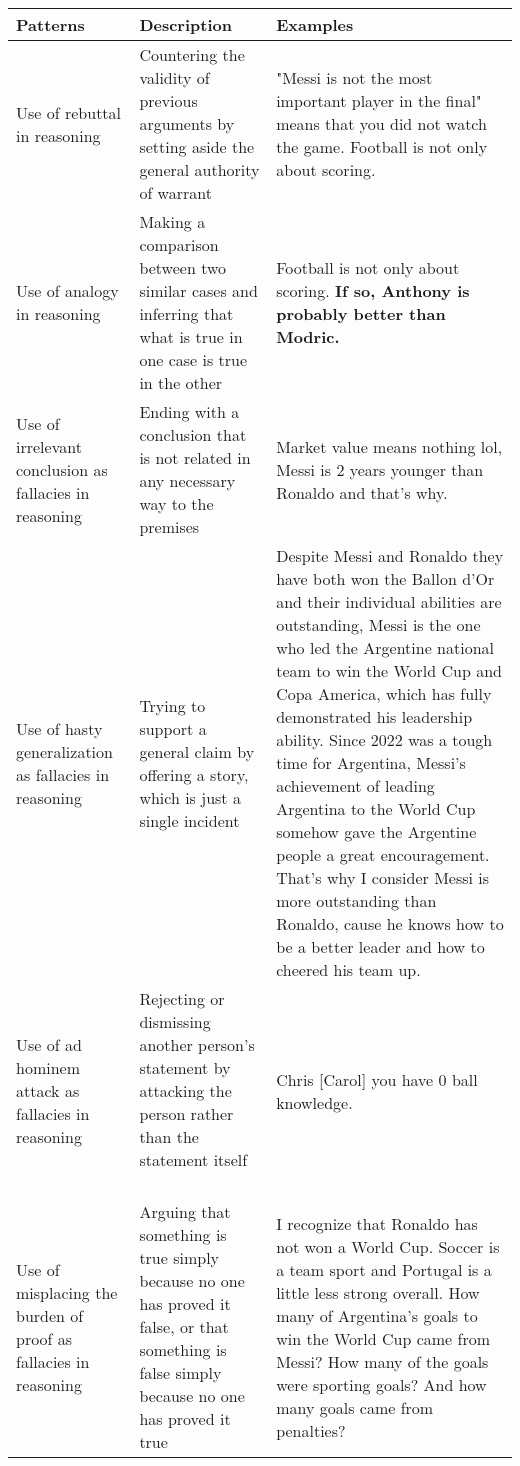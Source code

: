 \begin{table*}[h!]
  \caption{Emerging "reasoning" patterns from the forum.}
  \begin{tabular}{>{\raggedright\arraybackslash}p{2.5cm}>{\raggedright\arraybackslash}p{4cm}>{\raggedright\arraybackslash}p{9.5cm}}
    \toprule
    \textbf{Patterns} & \textbf{Description} & \textbf{Examples}\\
    \midrule
    Use of rebuttal in reasoning & Countering the validity of previous arguments by setting aside the general authority of warrant ~\cite{toulmin_uses_2003} & "Messi is not the most important player in the final" means that you did not watch the game. Football is not only about scoring. \\
    \hline
    Use of analogy in reasoning & Making a comparison between two similar cases and inferring that what is true in one case is true in the other ~\cite{freeley_argumentation_2008} & Football is not only about scoring. \textbf{If so, Anthony is probably better than Modric.}\\
    \hline
    Use of irrelevant conclusion as fallacies in reasoning & Ending with a conclusion that is not related in any necessary way to the premises ~\cite{kord_grey_2021} & Market value means nothing lol, Messi is 2 years younger than Ronaldo and that's why.\\
    \hline
    Use of hasty generalization as fallacies in reasoning & Trying to support a general claim by offering a story, which is just a single incident ~\cite{kord_grey_2021, van_eemeren_argumentation_2016} & Despite Messi and Ronaldo they have both won the Ballon d'Or and their individual abilities are outstanding, Messi is the one who led the Argentine national team to win the World Cup and Copa America, which has fully demonstrated his leadership ability. Since 2022 was a tough time for Argentina, Messi's achievement of leading Argentina to the World Cup somehow gave the Argentine people a great encouragement. That's why I consider Messi is more outstanding than Ronaldo, cause he knows how to be a better leader and how to cheered his team up. \\
    \hline
    Use of ad hominem attack as fallacies in reasoning & Rejecting or dismissing another person's statement by attacking the person rather than the statement itself ~\cite{kord_grey_2021, van_eemeren_argumentation_2016}& Chris [Carol] you have 0 ball knowledge. \\
    \hline
    Use of misplacing the burden of proof as fallacies in reasoning & Arguing that something is true simply because no one has proved it false, or that something is false simply because no one has proved it true ~\cite{kord_grey_2021} & I recognize that Ronaldo has not won a World Cup. Soccer is a team sport and Portugal is a little less strong overall. How many of Argentina's goals to win the World Cup came from Messi? How many of the goals were sporting goals? And how many goals came from penalties? \\

\end{tabular}
\end{table*}
